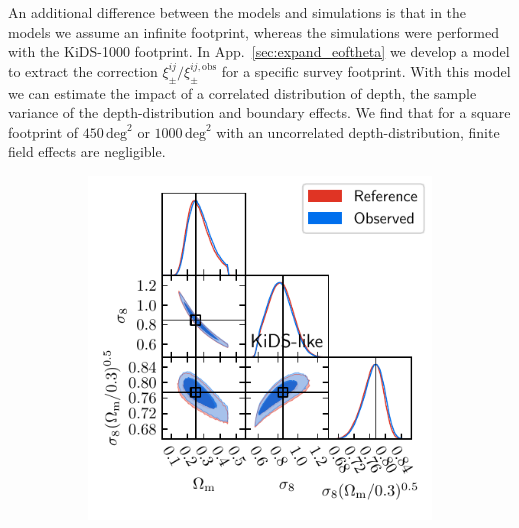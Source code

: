 \documentclass{aa}
\renewcommand{\rm}{\mathrm}
\begin{document}
An additional difference between the models and simulations is that in the models we assume an infinite footprint, whereas the simulations were performed with the KiDS-1000 footprint. In App.~\ref{sec:expand_eoftheta} we develop a model to extract the correction $\xi_\pm^{ij}/\xi_{\pm}^{ij,\rm{obs}}$ for a specific survey footprint. With this model we can estimate the impact of a correlated distribution of depth, the sample variance of the depth-distribution and boundary effects. We find that for a square footprint of $450\,\rm{deg}^2$ or $1000\,\rm{deg}^2$ with an uncorrelated depth-distribution, finite field effects are negligible.

\begin{figure}
\begin{subfigure}{0.45\textwidth}
  \includegraphics[width=\textwidth]{images/mcmc_kids.pdf}
\end{subfigure}
\begin{subfigure}{0.45\textwidth}

\end{subfigure}
\end{figure}
\end{document}
